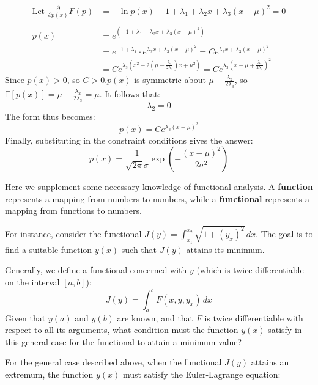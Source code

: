 \documentclass[../main.tex]{subfiles}
\begin{document}
\begin{align*}
\text{Let } \frac{\partial}{\partial p(x)} F(p) &= -\ln p(x) - 1 + \lambda_{1} + \lambda_{2} x + \lambda_{3}(x-\mu)^{2} = 0 \\
\\
p(x) &= e^{\left(-1 + \lambda_{1} + \lambda_{2} x + \lambda_{3}(x-\mu)^{2}\right)} \\
      &= e^{-1 + \lambda_{1}} \cdot e^{\lambda_{2} x + \lambda_{3}(x-\mu)^{2}} = C e^{\lambda_{2} x + \lambda_{3}(x-\mu)^{2}} \\
      &= C e^{\lambda_{3}\left(x^{2} - 2\left(\mu - \frac{\lambda_{2}}{2 \lambda_{3}}\right) x + \mu^{2}\right)} = C e^{\lambda_{3}\left(x - \mu + \frac{\lambda_{2}}{2\lambda_{3}}\right)^{2}}
\end{align*}
Since $p(x) > 0$, so $C > 0$.$p(x)$ is symmetric about $\mu - \frac{\lambda_{2}}{2\lambda_{3}}$, so $\mathbb{E}[p(x)] = \mu - \frac{\lambda_{2}}{2\lambda_{3}} = \mu$.
It follows that:
$$
\lambda_{2} = 0
$$
The form thus becomes:
$$
p(x) = C e^{\lambda_{3}(x-\mu)^{2}}
$$
Finally, substituting in the constraint conditions gives the answer:
$$
p(x)=\frac{1}{\sqrt{2\pi}\sigma}\exp(-\frac{(x-\mu)^2}{2\sigma^2})
$$
\begin{green}
    
Here we supplement some necessary knowledge of functional analysis. A \textbf{function} represents a mapping from numbers to numbers, while a \textbf{functional} represents a mapping from functions to numbers.

For instance, consider the functional $J(y) = \int_{x_1}^{x_2} \sqrt{1 + (y_x)^2}  \, dx$. The goal is to find a suitable function $y(x)$ such that $J(y)$ attains its minimum.

Generally, we define a functional concerned with $y$ (which is twice differentiable on the interval $[a, b]$):
$$
J(y) = \int_{a}^{b} F(x, y, y_x)  \, dx
$$
Given that $y(a)$ and $y(b)$ are known, and that $F$ is twice differentiable with respect to all its arguments, what condition must the function $y(x)$ satisfy in this general case for the functional to attain a minimum value?

For the general case described above, when the functional $J(y)$ attains an extremum, the function $y(x)$ must satisfy the Euler-Lagrange equation:

\end{green}
\end{document}
